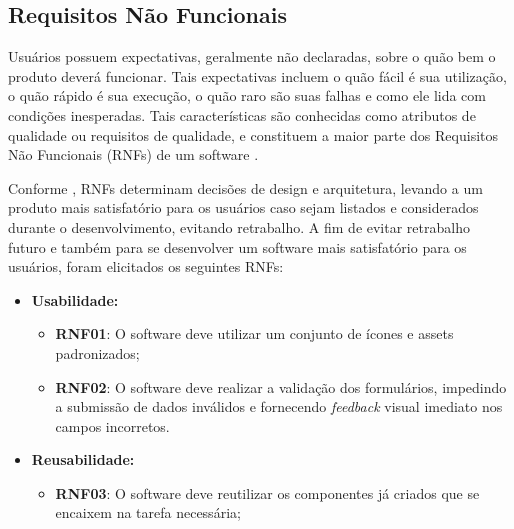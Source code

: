 \subsection[Requisitos Não Funcionais]{Requisitos Não Funcionais}

Usuários possuem expectativas, geralmente não declaradas, sobre o quão bem o produto deverá funcionar. Tais expectativas incluem o quão fácil é sua utilização, o quão rápido é sua execução, o quão raro são suas falhas e como ele lida com condições inesperadas. Tais características são conhecidas como atributos de qualidade ou requisitos de qualidade, e constituem a maior parte dos Requisitos Não Funcionais (RNFs) de um software \cite{wiegers2013software}.

Conforme , RNFs determinam decisões de design e arquitetura, levando a um produto mais satisfatório para os usuários caso sejam listados e considerados durante o desenvolvimento, evitando retrabalho. A fim de evitar retrabalho futuro e também para se desenvolver um software mais satisfatório para os usuários, foram elicitados os seguintes RNFs:

\begin{itemize}

\item \textbf{Usabilidade:}

\begin{itemize}

\item \textbf{RNF01}: O software deve utilizar um conjunto de ícones e assets padronizados;

\item \textbf{RNF02}: O software deve realizar a validação dos formulários, impedindo a submissão de dados inválidos e fornecendo \textit{feedback} visual imediato nos campos incorretos.

\end{itemize}

\end{itemize}

\begin{itemize}

\item \textbf{Reusabilidade:}

\begin{itemize}

\item \textbf{RNF03}: O software deve reutilizar os componentes já criados que se encaixem na tarefa necessária;

\end{itemize}

\end{itemize}


